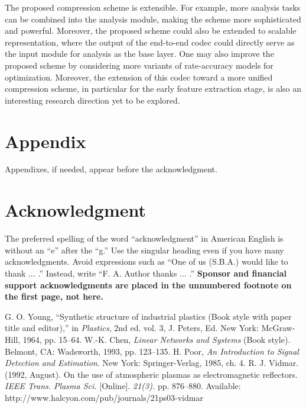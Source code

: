 \documentclass[transmag]{IEEEtran}
\begin{document}
The proposed compression scheme is extensible. For example, more analysis tasks can be combined into the analysis module, making the scheme more sophisticated and powerful. Moreover, the proposed scheme could also be extended to scalable representation, where the output of the end-to-end codec could directly serve as the input module for analysis as the base layer.
One may also improve the proposed scheme by considering more variants of rate-accuracy models for optimization. Moreover, the extension of this codec toward a more
unified compression scheme, in particular for the early feature extraction stage, is also an interesting research direction yet to be explored.




\iffalse
\section*{Appendix}

Appendixes, if needed, appear before the acknowledgment.

\section*{Acknowledgment}

The preferred spelling of the word ``acknowledgment'' in American English is 
without an ``e'' after the ``g.'' Use the singular heading even if you have 
many acknowledgments. Avoid expressions such as ``One of us (S.B.A.) would 
like to thank $\ldots$ .'' Instead, write ``F. A. Author thanks $\ldots$ .'' 
\textbf{Sponsor and financial support acknowledgments are placed in the 
unnumbered footnote on the first page, not here.}


\begin{thebibliography}{00}
 G. O. Young, ``Synthetic structure of industrial plastics (Book style with paper title and editor),'' in \emph{Plastics}, 2nd ed. vol. 3, J. Peters, Ed. New York: McGraw-Hill, 1964, pp. 15--64.
 W.-K. Chen, \emph{Linear Networks and Systems} (Book style)$. $Belmont, CA: Wadsworth, 1993, pp. 123--135.
 H. Poor, \emph{An Introduction to Signal Detection and Estimation}. New York: Springer-Verlag, 1985, ch. 4.
 R. J. Vidmar. (1992, August). On the use of atmospheric plasmas as electromagnetic reflectors. \emph{IEEE Trans. Plasma Sci.} [Online]. \emph{21(3).} pp. 876--880. Available: http://www.halcyon.com/pub/journals/21ps03-vidmar
\end{thebibliography}
\end{document}
